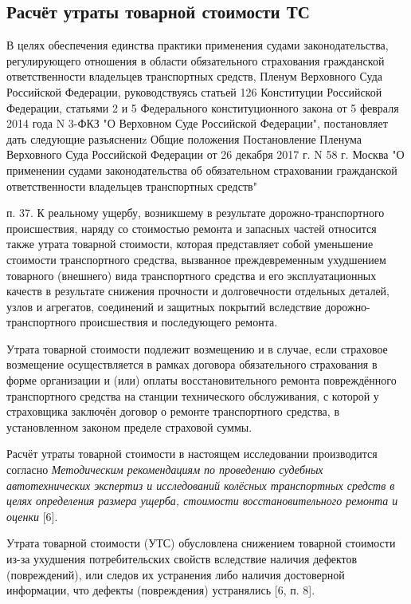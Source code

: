 \subsection{Расчёт утраты товарной стоимости ТС}

\par В целях обеспечения единства практики применения судами законодательства, регулирующего отношения в области обязательного страхования гражданской ответственности владельцев транспортных средств, Пленум Верховного Суда Российской Федерации, руководствуясь статьей 126 Конституции Российской Федерации, статьями 2 и 5 Федерального конституционного закона от 5 февраля 2014 года N 3-ФКЗ "О Верховном Суде Российской Федерации", постановляет дать следующие разъяснениz
Общие положения Постановление Пленума Верховного Суда Российской Федерации от 26 декабря 2017 г. N 58 г. Москва "О применении судами законодательства об обязательном страховании гражданской ответственности владельцев транспортных средств" 

п. 37. К реальному ущербу, возникшему в результате дорожно-транспортного происшествия, наряду со стоимостью ремонта и запасных частей относится также утрата товарной стоимости, которая представляет собой уменьшение стоимости транспортного средства, вызванное преждевременным ухудшением товарного (внешнего) вида транспортного средства и его эксплуатационных качеств в результате снижения прочности и долговечности отдельных деталей, узлов и агрегатов, соединений и защитных покрытий вследствие дорожно-транспортного происшествия и последующего ремонта.

 Утрата товарной стоимости подлежит возмещению и в случае, если страховое возмещение осуществляется в рамках договора обязательного страхования в форме организации и (или) оплаты восстановительного ремонта повреждённого транспортного средства на станции технического обслуживания, с которой у страховщика заключён договор о ремонте транспортного средства, в установленном законом пределе страховой суммы.

\par Расчёт утраты товарной стоимости в настоящем исследовании производится согласно \emph {Методическим рекомендациям по проведению судебных автотехнических экспертиз и исследований колёсных транспортных средств в целях определения размера ущерба, стоимости восстановительного ремонта и оценки}  [6].

\par Утрата товарной стоимости (УТС) обусловлена снижением товарной стоимости из-за ухудшения потребительских свойств вследствие наличия дефектов (повреждений), или следов их устранения либо наличия достоверной информации, что дефекты (повреждения) устранялись [6, п. 8].

